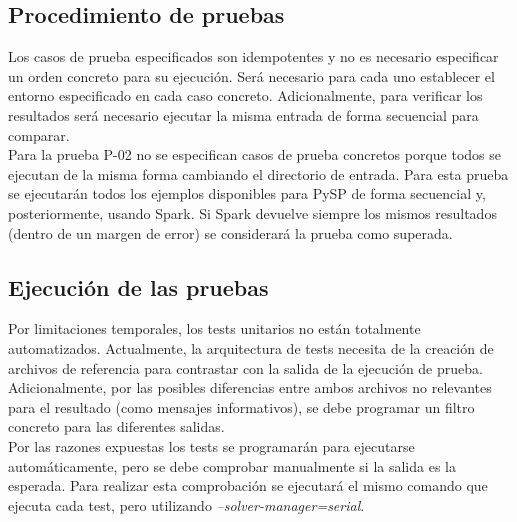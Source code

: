 
\subsection{Procedimiento de pruebas}

Los casos de prueba especificados son idempotentes y no es necesario especificar un orden concreto para su ejecución. Será necesario para cada uno establecer el entorno especificado en cada caso concreto. Adicionalmente, para verificar los resultados será necesario ejecutar la misma entrada de forma secuencial para comparar.\\

Para la prueba P-02 no se especifican casos de prueba concretos porque todos se ejecutan de la misma forma cambiando el directorio de entrada. Para esta prueba se ejecutarán todos los ejemplos disponibles para PySP de forma secuencial y, posteriormente, usando Spark. Si Spark devuelve siempre los mismos resultados (dentro de un margen de error) se considerará la prueba como superada.

\subsection{Ejecución de las pruebas}

Por limitaciones temporales, los tests unitarios no están totalmente automatizados. Actualmente, la arquitectura de tests necesita de la creación de archivos de referencia para contrastar con la salida de la ejecución de prueba. Adicionalmente, por las posibles diferencias entre ambos archivos no relevantes para el resultado (como mensajes informativos), se debe programar un filtro concreto para las diferentes salidas.\\

Por las razones expuestas los tests se programarán para ejecutarse automáticamente, pero se debe comprobar manualmente si la salida es la esperada. Para realizar esta comprobación se ejecutará el mismo comando que ejecuta cada test, pero utilizando {\it --solver-manager=serial}.\\

